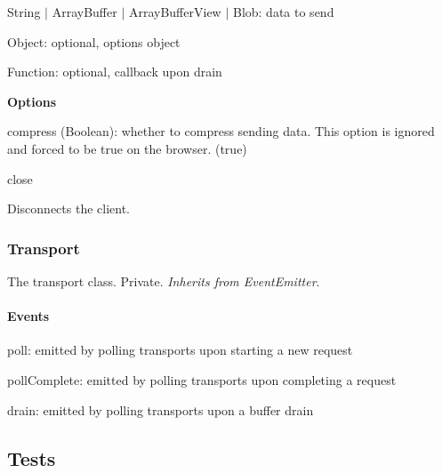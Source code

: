 \begin{DoxyItemize}
\begin{DoxyItemize}
\begin{DoxyItemize}
\item {\ttfamily String} $\vert$ {\ttfamily Array\+Buffer} $\vert$ {\ttfamily Array\+Buffer\+View} $\vert$ {\ttfamily Blob}\+: data to send
\item {\ttfamily Object}\+: optional, options object
\item {\ttfamily Function}\+: optional, callback upon {\ttfamily drain}
\end{DoxyItemize}
\item {\bfseries Options}
\begin{DoxyItemize}
\item {\ttfamily compress} ({\ttfamily Boolean})\+: whether to compress sending data. This option is ignored and forced to be {\ttfamily true} on the browser. ({\ttfamily true})
\end{DoxyItemize}
\end{DoxyItemize}
\item {\ttfamily close}
\begin{DoxyItemize}
\item Disconnects the client.
\end{DoxyItemize}
\end{DoxyItemize}

\subsubsection*{Transport}

The transport class. Private. {\itshape Inherits from Event\+Emitter}.

\paragraph*{Events}


\begin{DoxyItemize}
\item {\ttfamily poll}\+: emitted by polling transports upon starting a new request
\item {\ttfamily poll\+Complete}\+: emitted by polling transports upon completing a request
\item {\ttfamily drain}\+: emitted by polling transports upon a buffer drain
\end{DoxyItemize}

\subsection*{Tests}

